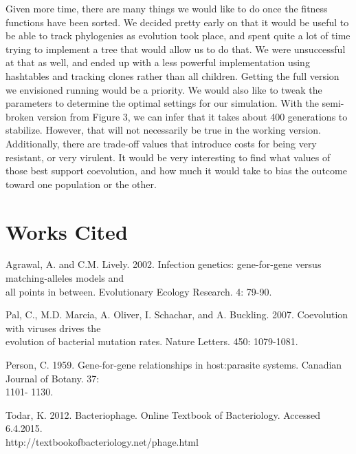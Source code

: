 \documentclass[11pt, oneside]{article}
\begin{document}
Given more time, there are many things we would like to do once the fitness functions have been sorted. We decided pretty early on that it would be useful to be able to track phylogenies as evolution took place, and spent quite a lot of time trying to implement a tree that would allow us to do that. We were unsuccessful at that as well, and ended up with a less powerful implementation using hashtables and tracking clones rather than all children. Getting the full version we envisioned running would be a priority. We would also like to tweak the parameters to determine the optimal settings for our simulation. With the semi-broken version from Figure 3, we can infer that it takes about 400 generations to stabilize. However, that will not necessarily be true in the working version. Additionally, there are trade-off values that introduce costs for being very resistant, or very virulent. It would be very interesting to find what values of those best support coevolution, and how much it would take to bias the outcome toward one population or the other. 

\section{Works Cited}
Agrawal, A. and C.M. Lively. 2002. Infection genetics: gene-for-gene versus matching-alleles models and \\\-\hspace{0.75cm} all points in between. Evolutionary Ecology Research. 4: 79-90.

Pal, C., M.D. Marcia, A. Oliver, I. Schachar, and A. Buckling. 2007. Coevolution with viruses drives the \\\-\hspace{0.75cm} evolution of bacterial mutation rates. Nature Letters. 450: 1079-1081.

Person, C. 1959. Gene-for-gene relationships in host:parasite systems. Canadian Journal of Botany. 37: \\\-\hspace{0.75cm} 1101- 1130.

Todar, K. 2012. Bacteriophage. Online Textbook of Bacteriology. Accessed 6.4.2015.\\\-\hspace{0.75cm} http://textbookofbacteriology.net/phage.html
\end{document}

